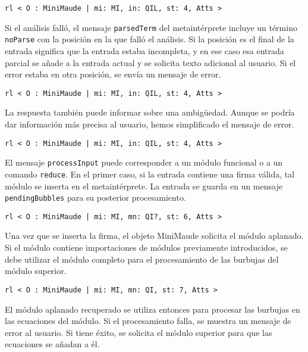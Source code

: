 \begin{lstlisting}[language=Maude]
   rl < O : MiniMaude | mi: MI, in: QIL, st: 4, Atts >
\end{lstlisting}
\medskip

Si el análisis falló, el mensaje \texttt{parsedTerm} del metaintérprete incluye un término \texttt{noParse} con la posición en la que falló el análisis. Si la posición es el final de la entrada significa que la entrada estaba incompleta, y en ese caso esa entrada parcial se añade a la entrada actual y se solicita texto adicional al usuario. Si el error estaba en otra posición, se envía un mensaje de error.

\begin{lstlisting}[language=Maude]
   rl < O : MiniMaude | mi: MI, in: QIL, st: 4, Atts >
\end{lstlisting}
\medskip

La respuesta también puede informar sobre una ambigüedad. Aunque se podría dar información más precisa al usuario, hemos simplificado el mensaje de error.

\begin{lstlisting}[language=Maude]
   rl < O : MiniMaude | mi: MI, in: QIL, st: 4, Atts >
\end{lstlisting}
\medskip

El mensaje \texttt{processInput} puede corresponder a un módulo funcional o a un comando \texttt{reduce}. En el primer caso, si la entrada contiene una firma válida, tal módulo se inserta en el metaintérprete. La entrada se guarda en un mensaje \texttt{pendingBubbles} para su posterior procesamiento.

\begin{lstlisting}[language=Maude]
   rl < O : MiniMaude | mi: MI, mn: QI?, st: 6, Atts >
\end{lstlisting}
\medskip

Una vez que se inserta la firma, el objeto MiniMaude solicita el módulo aplanado. Si el módulo contiene importaciones de módulos previamente introducidos, se debe utilizar el módulo completo para el procesamiento de las burbujas del módulo superior.

\begin{lstlisting}[language=Maude]
   rl < O : MiniMaude | mi: MI, mn: QI, st: 7, Atts >
\end{lstlisting}
\medskip

El módulo aplanado recuperado se utiliza entonces para procesar las burbujas en las ecuaciones del módulo. Si el procesamiento falla, se muestra un mensaje de error al usuario. Si tiene éxito, se solicita el módulo superior para que las ecuaciones se añadan a él.

